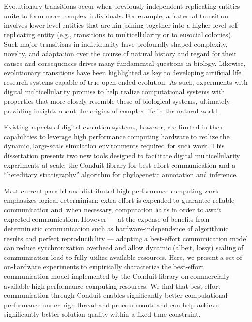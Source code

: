 Evolutionary transitions occur when previously-independent replicating entities unite to form more complex individuals.
For example, a fraternal transition involves lower-level entities that are kin joining together into a higher-level self-replicating entity (e.g., transitions to multicellularity or to eusocial colonies).
Such major transitions in individuality have profoundly shaped complexity, novelty, and adaptation over the course of natural history and regard for their causes and consequences drives many fundamental questions in biology.
Likewise, evolutionary transitions have been highlighted as key to developing artificial life research systems capable of true open-ended evolution.
As such, experiments with digital multicellularity promise to help realize computational systems with properties that more closely resemble those of biological systems, ultimately providing insights about the origins of complex life in the natural world.

Existing aspects of digital evolution systems, however, are limited in their capabilities to leverage high performance computing hardware to realize the dynamic, large-scale simulation environments required for such work.
This dissertation presents two new tools designed to facilitate digital multicellularity experiments at scale: the Conduit library for best-effort communication and a ``hereditary stratigraphy'' algorithm for phylogenetic annotation and inference.

Most current parallel and distributed high performance computing work emphasizes logical determinism: extra effort is expended to guarantee reliable communication and, when necessary, computation halts in order to await expected communication.
However --- at the expense of benefits from deterministic communication such as hardware-independence of algorithmic results and perfect reproducibility --- adopting a best-effort communication model can reduce synchronization overhead and allow dynamic (albeit, lossy) scaling of communication load to fully utilize available resources.
Here, we present a set of on-hardware experiments to empirically characterize the best-effort communication model implemented by the Conduit library on commercially available high-performance computing resources.
We find that best-effort communication through Conduit enables significantly better computational performance under high thread and process counts and can help achieve significantly better solution quality within a fixed time constraint.

